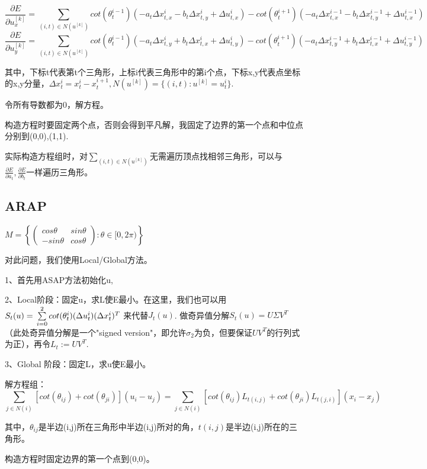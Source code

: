 \documentclass[12pt]{article}
\begin{document}
$$\frac{\partial E}{\partial u_x^{[k]}}=\sum\limits_{(i,t)\in N(u^{[k]})} cot(\theta_t^{i-1})(-a_t\Delta x_{t,x}^i-b_t\Delta x_{t,y}^i+\Delta u_{t,x}^i)- cot(\theta_t^{i+1})(-a_t\Delta x_{t,x}^{i-1}-b_t\Delta x_{t,y}^{i-1}+\Delta u_{t,x}^{i-1})$$
$$\frac{\partial E}{\partial u_y^{[k]}}=\sum\limits_{(i,t)\in N(u^{[k]})} cot(\theta_t^{i-1})(-a_t\Delta x_{t,y}^i+b_t\Delta x_{t,x}^i+\Delta u_{t,y}^i)- cot(\theta_t^{i+1})(-a_t\Delta x_{t,y}^{i-1}+b_t\Delta x_{t,x}^{i-1}+\Delta u_{t,y}^{i-1})$$


其中，下标t代表第t个三角形，上标i代表三角形中的第i个点，下标x,y代表点坐标的x,y分量，$\Delta x_t^i=x_t^i-x_t^{i+1},N(u^{[k]})=\{(i,t):u^{[k]}=u_t^i\}$.

令所有导数都为0，解方程。

构造方程时要固定两个点，否则会得到平凡解，我固定了边界的第一个点和中位点分别到(0,0),(1,1).

实际构造方程组时，对$\sum\limits_{(i,t)\in N(u^{[k]})}$无需遍历顶点找相邻三角形，可以与$\frac{\partial E}{\partial a_t},\frac{\partial E}{\partial b_t}$一样遍历三角形。


\subsection{ARAP}
$M=\left\{  \begin{pmatrix}cos\theta & sin\theta\\-sin\theta & cos\theta \end{pmatrix}:\theta\in  [0,2\pi)  \right\}$

对此问题，我们使用Local/Global方法。

1、首先用ASAP方法初始化u,

2、Local阶段：固定u，求L使E最小。在这里，我们也可以用$S_t(u)=\\\sum\limits_{i=0}^2cot(\theta_t^i)(\Delta u_t^i)(\Delta x_t^i)^T$ 来代替$J_t(u)$. 做奇异值分解$S_t(u)=U\Sigma V^T$ （此处奇异值分解是一个"signed version"，即允许$\sigma_2$为负，但要保证$UV^T$的行列式为正），再令$L_t:=UV^T.$\

3、Global 阶段：固定L，求u使E最小。

解方程组：
$$\sum\limits_{j\in N(i)}[cot(\theta_{ij})+cot(\theta_{ji})](u_i-u_j)=\sum\limits_{j\in N(i)}[cot(\theta_{ij})L_{t(i,j)}+cot(\theta_{ji})L_{t(j,i)}](x_i-x_j)$$

其中，$\theta_{ij}$是半边(i,j)所在三角形中半边(i,j)所对的角，$t(i,j)$是半边(i,j)所在的三角形。

构造方程时固定边界的第一个点到(0,0)。
\end{document}
